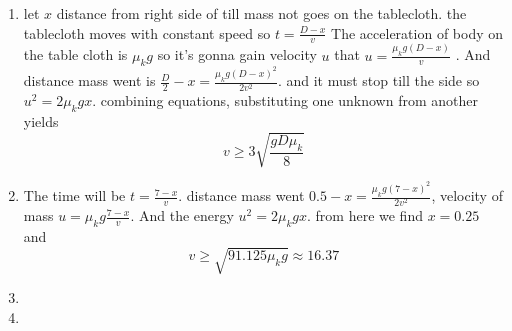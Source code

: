 \begin{sol}
    \begin{enumerate}[label=\textbf{(\alph*)}]
        \item 
        let $x$ distance from right side of till mass not goes on the tablecloth. the tablecloth  moves with constant speed so $t=\frac{D-x}{v}$ The acceleration of body on the table cloth is $\mu_kg$ so it's gonna gain velocity $u$ that $u=\frac{\mu_kg(D-x)}{v}$
        . And distance mass went is $\frac{D}{2}-x=\frac{\mu_kg(D-x)^2}{2v^2 }$. and it must stop till the side so $u^2=2\mu_kgx$. combining equations, substituting one unknown from another yields $$v\ge3\sqrt{\frac{gD\mu_k}{8}}$$
        \item 
        The time will be $t=\frac{7-x}{v}$. distance mass went $0.5-x=\frac{\mu_kg(7-x)^2}{2v^2 }$, velocity of mass $u=\mu_kg\frac{7-x}{v}$. And the energy $u^2=2\mu_kgx$. from here  we find $x=0.25$ and 
        $$v\ge \sqrt{91.125\mu_kg}\approx 16.37 $$
        \item 
        \item 
    \end{enumerate}
\vspace{15mm}
\end{sol}